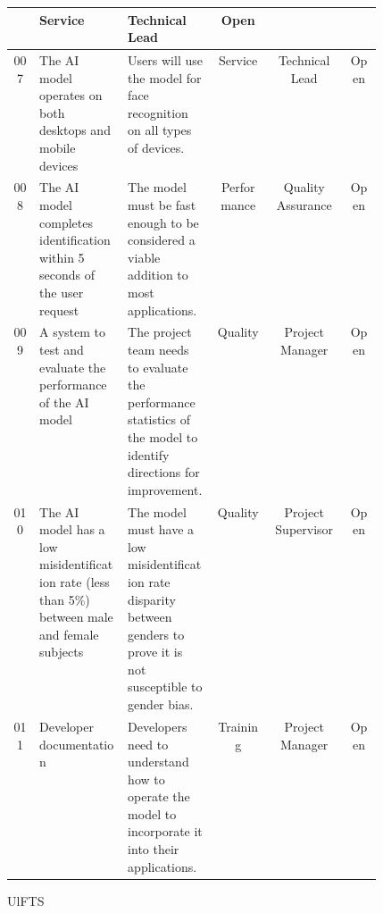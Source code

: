 {\begin{tabular}{|c|m{0.24\linewidth}|m{0.24\linewidth}|c|c|c|}
    & Service
    & Technical Lead
    & Open \\
    \hline
    007 
    & The AI model operates on both desktops and mobile devices
    & Users will use the model for face recognition on all types of devices.
    & Service
    & Technical Lead
    & Open \\
    \hline
    008 
    & The AI model completes identification within 5 seconds of the user request
    & The model must be fast enough to be considered a viable addition to most applications.
    & Performance
    & Quality Assurance
    & Open \\
    \hline
    009
    & A system to test and evaluate the performance of the AI model
    & The project team needs to evaluate the performance statistics of the model to identify directions for improvement.
    & Quality
    & Project Manager
    & Open \\
    \hline
    010
    & The AI model has a low misidentification rate (less than 5\%) between male and female subjects
    & The model must have a low misidentification rate disparity between genders to prove it is not susceptible to gender bias.
    & Quality
    & Project Supervisor
    & Open \\
    \hline
    011
    & Developer documentation 
    & Developers need to understand how to operate the model to incorporate it into their applications. 
    & Training 
    & Project Manager
    & Open \\
    \hline
\end{tabular}%
}{U}{l}{F}{T}{S}